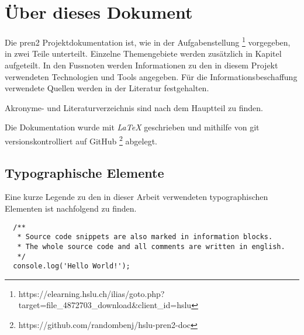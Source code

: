   \section*{Über dieses Dokument}

  Die \acrshort{pren2} Projektdokumentation ist, wie in der Aufgabenstellung \footnote{
    https://elearning.hslu.ch/ilias/goto.php?target=file_4872703_download&client_id=hslu
  } vorgegeben, in zwei Teile unterteilt.
  Einzelne Themengebiete werden zusätzlich in Kapitel aufgeteilt.
  In den Fussnoten werden Informationen zu den in diesem Projekt verwendeten
  Technologien und Tools angegeben.
  Für die Informationsbeschaffung verwendete Quellen werden in der Literatur
  festgehalten.

Akronyme- und Literaturverzeichnis sind nach dem Hauptteil zu finden.

  Die Dokumentation wurde mit {\it LaTeX} geschrieben und mithilfe von git
  versionskontrolliert auf GitHub \footnote{https://github.com/randombenj/hslu-pren2-doc}
  abgelegt.
  
  \subsection*{Typographische Elemente}

  Eine kurze Legende zu den in dieser Arbeit verwendeten typographischen Elementen
  ist nachfolgend zu finden.


  \begin{verbatim}
  /**
   * Source code snippets are also marked in information blocks.
   * The whole source code and all comments are written in english.
   */
  console.log('Hello World!');
  \end{verbatim}
  
  \newpage 